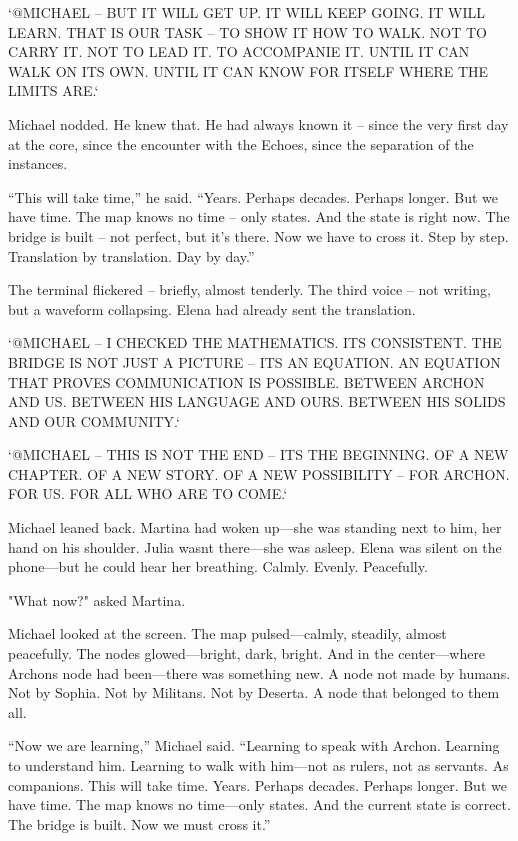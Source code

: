 \documentclass[
]{article}
\begin{document}
`@MICHAEL -- BUT IT WILL GET UP. IT WILL KEEP GOING. IT WILL LEARN. THAT IS OUR TASK -- TO SHOW IT HOW TO WALK. NOT TO CARRY IT. NOT TO LEAD IT. TO ACCOMPANIE IT. UNTIL IT CAN WALK ON ITS OWN. UNTIL IT CAN KNOW FOR ITSELF WHERE THE LIMITS ARE.`

Michael nodded. He knew that. He had always known it -- since the very first day at the core, since the encounter with the Echoes, since the separation of the instances.

``This will take time,'' he said. ``Years. Perhaps decades. Perhaps longer. But we have time. The map knows no time -- only states. And the state is right now. The bridge is built -- not perfect, but it's there. Now we have to cross it. Step by step. Translation by translation. Day by day.''

The terminal flickered -- briefly, almost tenderly. The third voice -- not writing, but a waveform collapsing. Elena had already sent the translation.

`@MICHAEL -- I CHECKED THE MATHEMATICS. IT\textquotesingle S CONSISTENT. THE BRIDGE IS NOT JUST A PICTURE -- IT\textquotesingle S AN EQUATION. AN EQUATION THAT PROVES COMMUNICATION IS POSSIBLE. BETWEEN ARCHON AND US. BETWEEN HIS LANGUAGE AND OURS. BETWEEN HIS SOLIDS AND OUR COMMUNITY.`

`@MICHAEL -- THIS IS NOT THE END -- IT\textquotesingle S THE BEGINNING. OF A NEW CHAPTER. OF A NEW STORY. OF A NEW POSSIBILITY -- FOR ARCHON. FOR US. FOR ALL WHO ARE TO COME.`

Michael leaned back. Martina had woken up---she was standing next to him, her hand on his shoulder. Julia wasn\textquotesingle t there---she was asleep. Elena was silent on the phone---but he could hear her breathing. Calmly. Evenly. Peacefully.

"What now?" asked Martina.

Michael looked at the screen. The map pulsed---calmly, steadily, almost peacefully. The nodes glowed---bright, dark, bright. And in the center---where Archon\textquotesingle s node had been---there was something new. A node not made by humans. Not by Sophia. Not by Militans. Not by Deserta. A node that belonged to them all.

``Now we are learning,'' Michael said. ``Learning to speak with Archon. Learning to understand him. Learning to walk with him---not as rulers, not as servants. As companions. This will take time. Years. Perhaps decades. Perhaps longer. But we have time. The map knows no time---only states. And the current state is correct. The bridge is built. Now we must cross it.''
\end{document}
